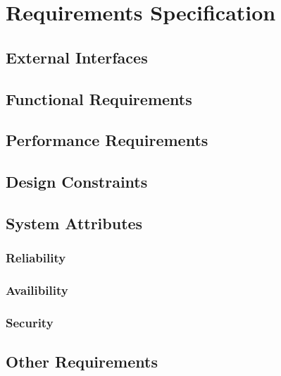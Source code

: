 \section{Requirements Specification}
\subsection{External Interfaces}
\subsection{Functional Requirements}
\subsection{Performance Requirements}
\subsection{Design Constraints}
\subsection{System Attributes}
\subsubsection{Reliability}
\subsubsection{Availibility}
\subsubsection{Security}
\subsection{Other Requirements}
